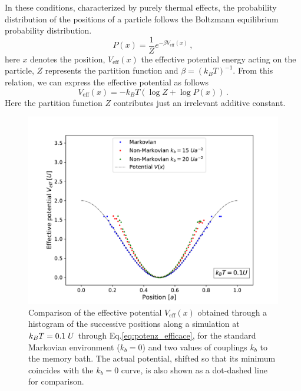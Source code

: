 In these conditions, characterized by purely thermal effects, the probability distribution of the positions of a particle follows the Boltzmann equilibrium probability distribution.
\begin{equation}
    P(x) = \dfrac{1}{Z} e^{-\beta V_\text{eff}(x)}\, ,
\end{equation}
here $x$ denotes the position, $V_\text{eff}(x)$ the effective potential energy acting on the particle, $Z$ represents the partition function and $\beta =(k_B T)^{-1}$.
From this relation, we can express the effective potential as follows
\begin{equation}
    V_\text{eff}(x)=-k_BT \left(\log{Z} + \log{P(x)}\right)\, .
    \label{eq:potenz_efficace}
\end{equation}
Here the partition function $Z$ contributes just an irrelevant additive constant.
\begin{figure}
    \centering
    \includegraphics[width=\textwidth]{T01_U_eff.pdf}
    \caption{Comparison of the effective potential $V_\text{eff}(x)$ obtained through a histogram of the successive positions along a simulation at $k_BT=0.1\hspace{0.1cm}U$ through Eq.\eqref{eq:potenz_efficace}, for the standard Markovian environment ($k_b=0$) and two values of couplings $k_b$ to the memory bath. The actual potential, shifted so that its minimum coincides with the $k_b=0$ curve, is also shown as a dot-dashed line for comparison.}
    \label{fig:eff_pot_kbt01}
\end{figure}
